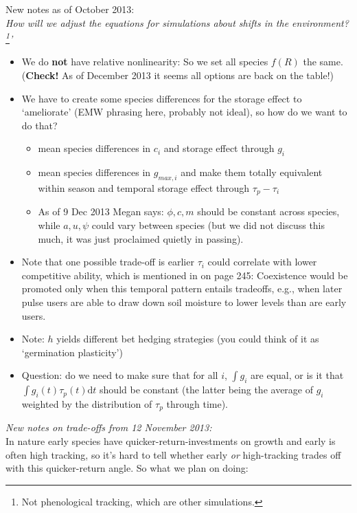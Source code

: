 \documentclass[11pt,a4paper,oneside]{article}
\begin{document}
\noindent New notes as of October 2013:\\
\emph{How will we adjust the equations for simulations about shifts in the environment?\footnote{Not phenological tracking, which are other simulations.}'}
\begin{itemize}
\item We do {\bf not} have relative nonlinearity: So we set all species \(f(R)\) the same. ({\bf Check!} As of December 2013 it seems all options are back on the table!)
\item We have to create some species differences for the storage effect to `ameliorate' (EMW phrasing here, probably not ideal), so how do we want to do that?
\begin{itemize}
\item mean species differences in \(c_{i}\) and storage effect through \(g_{i}\) 
\item mean species differences in \(g_{max,i}\) and make them totally equivalent within season and temporal storage effect through \(\tau_{p}-\tau_{i}\) 
\item As of 9 Dec 2013 Megan says: \(\phi, c, m\) should be constant across species, while \(a, u, \psi\) could vary between species (but we did not discuss this much, it was just proclaimed quietly in passing).
\end{itemize}
\item Note that one possible trade-off is earlier \(\tau_{i}\) could correlate with lower competitive ability, which is mentioned in \citet{Chesson:2004eo} on page 245: Coexistence would be promoted
only when this temporal pattern entails tradeoffs, e.g.,
when later pulse users are able to draw down soil moisture
to lower levels than are early users.
\item Note: \(h\) yields different bet hedging strategies (you could think of it as `germination plasticity')
\item Question: do we need to make sure that for all \(i\), \(\int g_{i}\) are equal, or is it that \(\int g_{i}(t)\tau_{p}(t)\mathrm{d}t\) should be constant (the latter being the average of \(g_{i}\) weighted by the distribution of \(\tau_{p}\) through time).
\end{itemize}

\noindent \emph{New notes on trade-offs from 12 November 2013:}\\
In nature early species have quicker-return-investments on growth and early is often high tracking, so it's hard to tell whether early \emph{or} high-tracking trades off with this quicker-return angle. So what we plan on doing:\\
\end{document}

